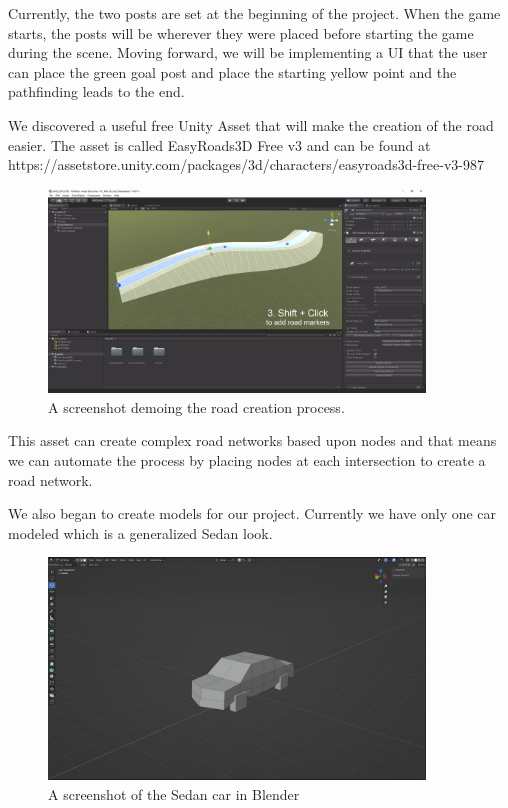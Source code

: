 \begin{flushleft}
Currently, the two posts are set at the beginning of the project. When the game starts, the posts will be wherever they were placed before starting the game during the scene. Moving forward, we will be implementing a UI that the user can place the green goal post and place the starting yellow point and the pathfinding leads to the end. 
\end{flushleft}

We discovered a useful free Unity Asset that will make the creation of the road easier.
The asset is called EasyRoads3D Free v3 and can be found at https://assetstore.unity.com/packages/3d/characters/easyroads3d-free-v3-987

\begin{figure}[!htbp]
    \centering
    \includegraphics[width=10cm]{../Images/Update2/RoadBuild.png}
       \caption{A screenshot demoing the road creation process.}
           \label{Fig:RoadNetworkCreation}
  \end{figure}

This asset can create complex road networks based upon nodes and that means we can automate the process by placing nodes at each intersection to create a road network.

We also began to create models for our project.
Currently we have only one car modeled which is a generalized Sedan look.

\begin{figure}[!htbp]
    \centering
    \includegraphics[width=10cm]{../Images/Update2/SedanRender.PNG}
       \caption{A screenshot of the Sedan car in Blender}
           \label{Fig:Sedan car}
  \end{figure}

